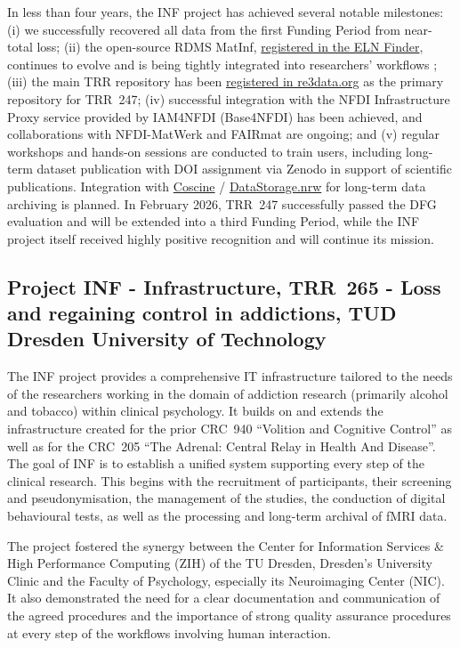\documentclass{eceasst}
\begin{document}
In less than four years, the INF project has achieved several notable milestones: (i) we successfully recovered all data from the first Funding Period from near-total loss; (ii) the open-source RDMS MatInf, \href{https://eln-finder.ulb.tu-darmstadt.de/items/8aefad94-9f2d-4b40-b94f-21c9419eb3be}{registered in the ELN Finder}, continues to evolve and is being tightly integrated into researchers’ workflows \cite{Dudarev2025}; (iii) the main TRR repository has been \href{https://doi.org/10.17616/R31NJNUG}{registered in re3data.org} as the primary repository for TRR~247; (iv) successful integration with the NFDI Infrastructure Proxy service provided by IAM4NFDI (Base4NFDI) has been achieved, and collaborations with NFDI-MatWerk and FAIRmat are ongoing; and (v) regular workshops and hands-on sessions are conducted to train users, including long-term dataset publication with DOI assignment via Zenodo in support of scientific publications.
Integration with \href{https://about.coscine.de/}{Coscine} / \href{https://about.coscine.de/news/post-30/}{DataStorage.nrw} for long-term data archiving is planned.
In February 2026, TRR~247 successfully passed the DFG evaluation and will be extended into a third Funding Period, while the INF project itself received highly positive recognition and will continue its mission.

\subsection{Project INF - Infrastructure, TRR~265 - Loss and regaining control in addictions, TUD Dresden University of Technology}
\label{subsec:trr265}
The INF project provides a comprehensive IT infrastructure tailored to the needs of the researchers working in the domain of addiction research (primarily alcohol and tobacco) within clinical psychology.
It builds on and extends the infrastructure created for the prior CRC~940 ``Volition and Cognitive Control'' as well as for the CRC~205 ``The Adrenal: Central Relay in Health And Disease''.
The goal of INF is to establish a unified system supporting every step of the clinical research.
This begins with the recruitment of participants, their screening and pseudonymisation, the management of the studies, the conduction of digital behavioural tests, as well as the processing and long-term archival of fMRI data.

The project fostered the synergy between the Center for Information Services \& High Performance Computing (ZIH) of the TU Dresden, Dresden's University Clinic and the Faculty of Psychology, especially its Neuroimaging Center (NIC).
It also demonstrated the need for a clear documentation and communication of the agreed procedures and the importance of strong quality assurance procedures at every step of the workflows involving human interaction.
\end{document}
